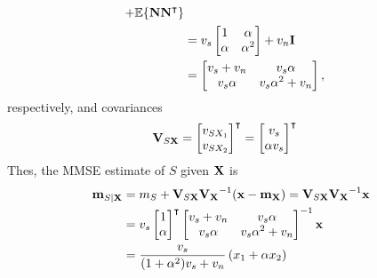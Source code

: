 \begin{solution}
\begin{parts}
\begin{align*}
	 + \mathbb{E}\{{\bf N} {\bf N} ^\intercal \}  \\
	&= v_s \begin{bmatrix} 1 & \alpha \\ \alpha & \alpha^2 \end{bmatrix} + v_n {\bf I}  \\ 
	&= \begin{bmatrix} v_s + v_n & v_s \alpha \\ v_s \alpha & v_s \alpha^2 + v_n \end{bmatrix},
\end{align*}
respectively, and covariances
\begin{align*}
{\bf V}_{S{\bf X}}  
	&= \begin{bmatrix} v_{SX_1} \\ v_{SX_2} \end{bmatrix}^\intercal
	 = \begin{bmatrix} v_s \\ \alpha v_s \end{bmatrix}^\intercal
\end{align*}
Thes, the MMSE estimate of $S$ given ${\bf X}$ is
\begin{align*}
{\bf m}_{S |{\bf X}} 
      &= m_S + {\bf V}_{S {\bf X}}{\bf V_X}^{-1}({\bf x}-{\bf m}_{\bf X}) 
       = {\bf V}_{S {\bf X}}{\bf V_X}^{-1}{\bf x}  \\ 
      &= v_s \begin{bmatrix} 1 \\ \alpha \end{bmatrix}^\intercal  
         \begin{bmatrix} v_s + v_n & v_s \alpha \\ v_s \alpha & v_s \alpha^2 + v_n \end{bmatrix}^{-1}{\bf x}  \\ 
      &= \frac{v_s}{(1 + \alpha^2)v_s + v_n} \left( x_1 + \alpha x_2\right)
\end{align*}
\end{parts}
\end{solution}
\fi